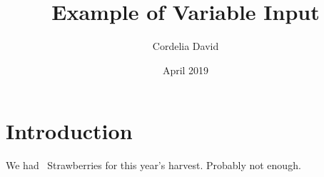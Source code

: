 \documentclass{article} \usepackage[utf8]{inputenc}
\title{Example of Variable Input}
\author{Cordelia David} \date{April 2019}
\begin{document}
\maketitle

\section{Introduction}

We had \Strawberries\ Strawberries for this year's harvest. Probably not enough.


\end{document}
